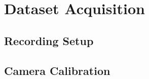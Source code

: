\chapter{Dataset Acquisition}
\label{chapter:acquisition}

\section{Recording Setup}
\label{sec:setup}

\section{Camera Calibration}
\label{sec:calibration}
